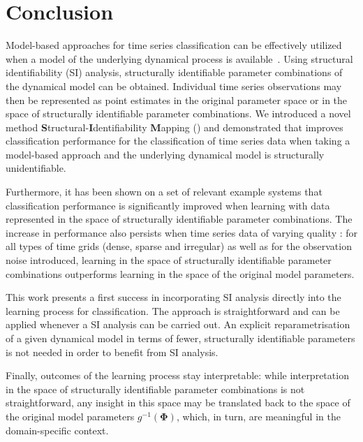 \section{Conclusion}\label{sec:conclusion}

Model-based approaches for time series classification can be effectively utilized when a model of the underlying dynamical process is available~\cite{shen2017classification}. 
Using structural identifiability (SI) analysis, structurally identifiable parameter combinations of the dynamical model can be obtained. 
Individual time series observations may then be represented as point estimates in the original parameter space or in the space of structurally identifiable parameter combinations. 
We introduced a novel method  \textbf{S}tructural-\textbf{I}dentifiability \textbf{M}apping (\myMethod{}) and demonstrated that \myMethod{} improves classification performance for the classification of time series data when taking a model-based approach and the underlying dynamical model is structurally unidentifiable.

Furthermore, it has been shown on a set of relevant example systems that classification performance is significantly improved when learning with data represented in the space of structurally identifiable parameter combinations. 
The increase in performance also persists when time series data of varying quality  : for all types of time grids (dense, sparse and irregular) as well as for  the observation noise introduced, learning in the space of structurally identifiable parameter combinations outperforms learning in the space of the original model parameters.

This work presents a first success in incorporating SI analysis directly into the learning process for classification. 
The \myMethod{} approach is straightforward and can be applied whenever a SI analysis can be carried out. 
An explicit reparametrisation of a given dynamical model in terms of fewer, structurally identifiable parameters is not needed in order to benefit from SI analysis. 

Finally, outcomes of the learning process stay interpretable: while interpretation in the space of structurally identifiable parameter combinations is not straightforward, any insight in this space may be translated back to the space of the original model parameters $g^{-1}(\boldsymbol{\Phi})$, which, in turn, are meaningful in the domain-specific context.
